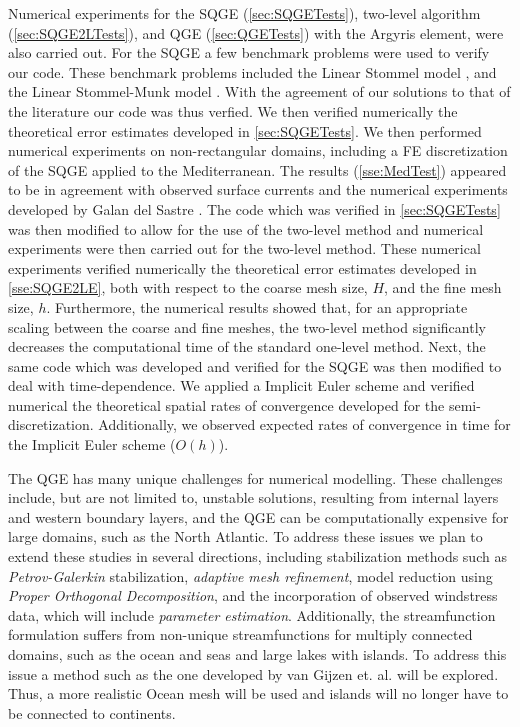 Numerical experiments for the SQGE (\autoref{sec:SQGETests}), two-level
algorithm (\autoref{sec:SQGE2LTests}), and QGE (\autoref{sec:QGETests}) with the
Argyris element, were also carried out. For the SQGE a few benchmark problems
were used to verify our code. These benchmark problems included the Linear
Stommel model \cite{Vallis06,Myers}, and the Linear Stommel-Munk model
\cite{Cascon}. With the agreement of our solutions to that of the literature our
code was thus verfied. We then verified numerically the theoretical error
estimates developed in \autoref{sec:SQGETests}. We then performed numerical
experiments on non-rectangular domains, including a FE discretization of the
SQGE applied to the Mediterranean. The results (\autoref{sse:MedTest}) appeared
to be in agreement with observed surface currents and the numerical experiments
developed by Galan del Sastre \cite{Galan-del-Sastre2004}. The code which was
verified in \autoref{sec:SQGETests} was then modified to allow for the use of
the two-level method and numerical experiments were then carried out for the
two-level method.  These numerical experiments verified numerically the
theoretical error estimates developed in \autoref{sse:SQGE2LE}, both with
respect to the coarse mesh size, $H$, and the fine mesh size, $h$.  Furthermore,
the numerical results showed that, for an appropriate scaling between the coarse
and fine meshes, the two-level method significantly decreases the computational
time of the standard one-level method. Next, the same code which was developed
and verified for the SQGE was then modified to deal with time-dependence. We
applied a Implicit Euler scheme and verified numerical the theoretical spatial
rates of convergence developed for the semi-discretization. Additionally, we
observed expected rates of convergence in time for the Implicit Euler scheme
($O(h)$).

The QGE has many unique challenges for numerical modelling. These challenges
include, but are not limited to, unstable solutions, resulting from internal
layers and western boundary layers, and the QGE can be computationally expensive
for large domains, such as the North Atlantic. To address these issues we plan
to extend these studies in several directions, including stabilization methods
such as \emph{Petrov-Galerkin} stabilization, \emph{adaptive mesh refinement},
model reduction using \emph{Proper Orthogonal Decomposition}, and the
incorporation of observed windstress data, which will include \emph{parameter
estimation}. Additionally, the streamfunction formulation suffers from
non-unique streamfunctions for multiply connected domains, such as the ocean and
seas and large lakes with islands. To address this issue a method such as the
one developed by van Gijzen et. al. \cite{van-Gijzen1998} will be explored.
Thus, a more realistic Ocean mesh will be used and islands will no longer have
to be connected to continents.
